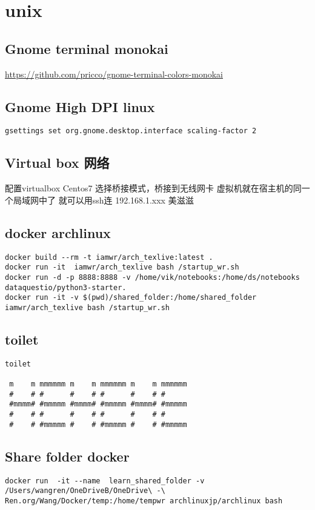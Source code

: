\documentclass[11pt]{article}
\author{王韧}
\date{\today}
\title{}
\begin{document}
\tableofcontents

\section{unix}
\label{sec:orgd31a75b}
\subsection{Gnome terminal monokai}
\label{sec:org837c6ad}
\url{https://github.com/pricco/gnome-terminal-colors-monokai}
\subsection{Gnome High DPI linux}
\label{sec:org6e3b722}
\begin{verbatim}
gsettings set org.gnome.desktop.interface scaling-factor 2 
\end{verbatim}
\subsection{Virtual box 网络}
\label{sec:org98069fe}
配置virtualbox
Centos7
选择桥接模式，桥接到无线网卡
虚拟机就在宿主机的同一个局域网中了
就可以用ssh连
192.168.1.xxx
美滋滋
\subsection{docker archlinux}
\label{sec:orge38032f}
\begin{verbatim}
docker build --rm -t iamwr/arch_texlive:latest .
docker run -it  iamwr/arch_texlive bash /startup_wr.sh
docker run -d -p 8888:8888 -v /home/vik/notebooks:/home/ds/notebooks dataquestio/python3-starter.
docker run -it -v $(pwd)/shared_folder:/home/shared_folder iamwr/arch_texlive bash /startup_wr.sh
\end{verbatim}
\subsection{toilet}
\label{sec:org912bb94}
\begin{verbatim}
toilet

 m    m mmmmmm m    m mmmmmm m    m mmmmmm
 #    # #      #    # #      #    # #
 #mmmm# #mmmmm #mmmm# #mmmmm #mmmm# #mmmmm
 #    # #      #    # #      #    # #
 #    # #mmmmm #    # #mmmmm #    # #mmmmm
\end{verbatim}
\subsection{Share folder docker}
\label{sec:orgc82915a}
\begin{verbatim}
docker run  -it --name  learn_shared_folder -v  /Users/wangren/OneDriveB/OneDrive\ -\ Ren.org/Wang/Docker/temp:/home/tempwr archlinuxjp/archlinux bash
\end{verbatim}
\end{document}
